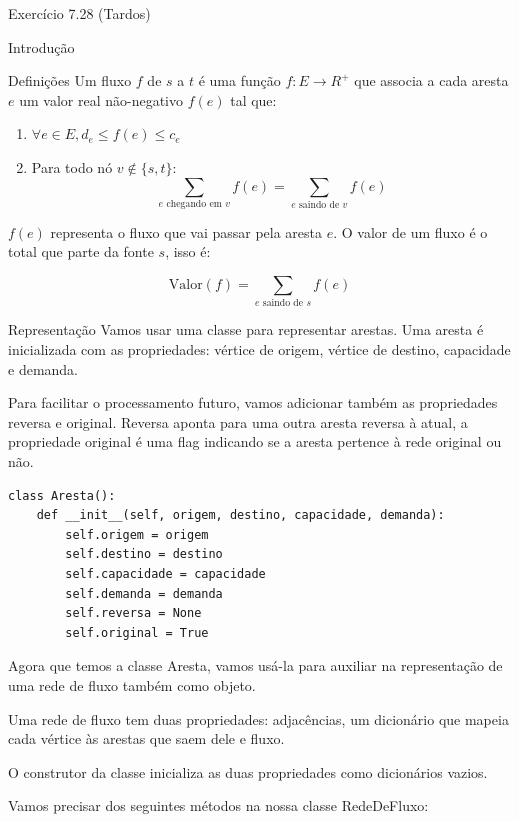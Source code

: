 \documentclass[presentation]{beamer}
\begin{document}
\begin{frame}[fragile,label=sec-2]{Exercício 7.28 (Tardos)}
\begin{block}{Introdução}
\begin{block}{Definições}
Um fluxo $f$ de $s$ a $t$ é uma função $f \colon E \to R^+$ que associa a cada
aresta $e$ um valor real não-negativo $f(e)$ tal que:

\begin{enumerate}
\item $\forall e \in E, d_e \leq f(e) \leq c_e$
\item Para todo nó $v \not\in \{s,t\}$:
\[ \sum_{e \text{ chegando em } v} f(e) = \sum_{e \text{ saindo de } v} f(e) \]
\end{enumerate}

$f(e)$ representa o fluxo que vai passar pela aresta $e$. O valor de
um fluxo é o total que parte da fonte $s$, isso é:

\begin{equation}
\label{valor_fluxo} \mathrm{Valor}(f) = \sum_{e \text{ saindo de } s} f(e)
\end{equation}
\end{block}

\begin{block}{Representação}
Vamos usar uma classe para representar arestas. Uma aresta é
inicializada com as propriedades: vértice de origem, vértice de
destino, capacidade e demanda.

Para facilitar o processamento futuro, vamos adicionar também as
propriedades reversa e original. Reversa aponta para uma outra aresta
reversa à atual, a propriedade original é uma flag indicando se a
aresta pertence à rede original ou não.
\begin{verbatim}
class Aresta():
    def __init__(self, origem, destino, capacidade, demanda):
        self.origem = origem
        self.destino = destino
        self.capacidade = capacidade
        self.demanda = demanda
        self.reversa = None
        self.original = True
\end{verbatim}

Agora que temos a classe Aresta, vamos usá-la para auxiliar na
representação de uma rede de fluxo também como objeto.

Uma rede de fluxo tem duas propriedades: adjacências, um dicionário
que mapeia cada vértice às arestas que saem dele e fluxo.

O construtor da classe inicializa as duas propriedades como dicionários vazios.

Vamos precisar dos seguintes métodos na nossa classe RedeDeFluxo:


\end{block}
\end{block}
\end{frame}
\end{document}
